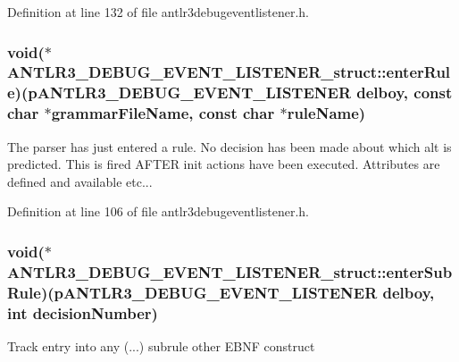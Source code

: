 Definition at line 132 of file antlr3debugeventlistener.\-h.

\hypertarget{struct_a_n_t_l_r3___d_e_b_u_g___e_v_e_n_t___l_i_s_t_e_n_e_r__struct_ac857f7eb0e3a8ac76119735c2e089961}{
\subsubsection[{enter\-Rule}]{\setlength{\rightskip}{0pt plus 5cm}void($\ast$ A\-N\-T\-L\-R3\-\_\-\-D\-E\-B\-U\-G\-\_\-\-E\-V\-E\-N\-T\-\_\-\-L\-I\-S\-T\-E\-N\-E\-R\-\_\-struct\-::enter\-Rule)({\bf p\-A\-N\-T\-L\-R3\-\_\-\-D\-E\-B\-U\-G\-\_\-\-E\-V\-E\-N\-T\-\_\-\-L\-I\-S\-T\-E\-N\-E\-R} delboy, const char $\ast${\bf grammar\-File\-Name}, const char $\ast$rule\-Name)}}\label{struct_a_n_t_l_r3___d_e_b_u_g___e_v_e_n_t___l_i_s_t_e_n_e_r__struct_ac857f7eb0e3a8ac76119735c2e089961}
The parser has just entered a rule. No decision has been made about which alt is predicted. This is fired A\-F\-T\-E\-R init actions have been executed. Attributes are defined and available etc... 

Definition at line 106 of file antlr3debugeventlistener.\-h.

\hypertarget{struct_a_n_t_l_r3___d_e_b_u_g___e_v_e_n_t___l_i_s_t_e_n_e_r__struct_a1f36733161c1f98cd9876d4e5ac572a2}{
\subsubsection[{enter\-Sub\-Rule}]{\setlength{\rightskip}{0pt plus 5cm}void($\ast$ A\-N\-T\-L\-R3\-\_\-\-D\-E\-B\-U\-G\-\_\-\-E\-V\-E\-N\-T\-\_\-\-L\-I\-S\-T\-E\-N\-E\-R\-\_\-struct\-::enter\-Sub\-Rule)({\bf p\-A\-N\-T\-L\-R3\-\_\-\-D\-E\-B\-U\-G\-\_\-\-E\-V\-E\-N\-T\-\_\-\-L\-I\-S\-T\-E\-N\-E\-R} delboy, int decision\-Number)}}\label{struct_a_n_t_l_r3___d_e_b_u_g___e_v_e_n_t___l_i_s_t_e_n_e_r__struct_a1f36733161c1f98cd9876d4e5ac572a2}
Track entry into any (...) subrule other E\-B\-N\-F construct 

